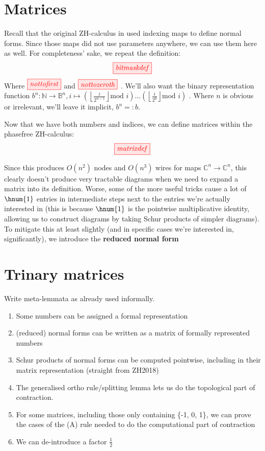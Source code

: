 \section{Matrices}\label{sec:matrices}
Recall that the original ZH-calculus in \cite{backens2018zhcalculus} used
indexing maps to define normal forms.  Since those maps did not use parameters
anywhere, we can use them here as well.  For completeness' sake, we repeat the
definition:
$$\tikzfig{bitmaskdef}$$
Where $\tikzfig{nottofirst}$ and $\tikzfig{nottozeroth}$ . We'll also want the
binary representation function 
$b^n : \mathbb{N} \rightarrow \mathbb{B}^n, i \mapsto \left( \left \lfloor
\frac{i}{2^{n-1}}\right \rfloor \text{mod } i \right) \ldots \left( \left \lfloor
\frac{i}{2^{0}}\right \rfloor \text{mod } i \right)$ . Where $n$ is obvious or
irrelevant, we'll leave it implicit, $b^n =: b$.

Now that we have both numbers and indices, we can define matrices within the
phasefree ZH-calculus:
$$\tikzfig{matrixdef}$$

Since this produces $O(n^2)$ nodes and $O(n^3)$ wires for maps $\mathbb{C}^n
\rightarrow \mathbb{C}^n$, this clearly doesn't produce very tractable diagrams
when we need to expand a matrix into its definition. Worse, some of the more
useful tricks cause a lot of $\hnum{1}$ entries in intermediate steps next to
the entries we're actually interested in (this is because $\hnum{1}$ is the
pointwise multiplicative identity, allowing us to construct diagrams by taking
Schur products of simpler diagrams). To mitigate this at least slightly (and in
specific cases we're interested in, significantly), we introduce the
\textbf{reduced normal form}


\section{Trinary matrices}
\begin{TODOLIST}
    Write meta-lemmata as already used informally.
    \begin{enumerate}
        \item Some numbers can be assigned a formal representation
        \item (reduced) normal forms can be written as a matrix of formally %
            represented numbers
        \item Schur products of normal forms can be computed pointwise,
            including in their matrix representation (straight from ZH2018)
        \item The generalised ortho rule/splitting lemma lets us do the
            topological part of contraction.
        \item For some matrices, including those only containing \{-1, 0, 1\}, we
            can prove the cases of the (A) rule needed to do the computational
            part of contraction
        \item We can de-introduce a factor $\frac{1}{2}$
    \end{enumerate}
\end{TODOLIST}

